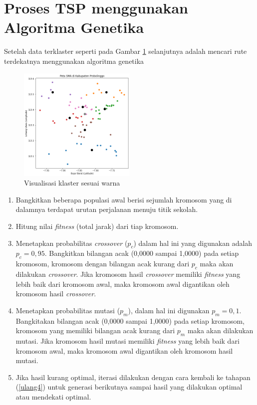 \section{Proses TSP menggunakan Algoritma Genetika}

Setelah data terklaster seperti pada Gambar \ref{fig:hasilklas} selanjutnya adalah mencari rute terdekatnya menggunakan algoritma genetika

\begin{figure}[H]
	\centering
	\includegraphics[width=0.5\textwidth]{Gambar/hasil klaster.png}
	\caption{Visualisasi klaster sesuai warna}
	\label{fig:hasilklas}
\end{figure}

\begin{enumerate}
	\item Bangkitkan beberapa populasi awal berisi sejumlah kromosom yang di dalamnya terdapat urutan perjalanan menuju titik sekolah.
	\item \label{ulang4} Hitung nilai \textit{fitness} (total jarak) dari tiap kromosom.
	\item Menetapkan probabilitas \textit{crossover} ($p_c$) dalam hal ini yang digunakan adalah $p_c=0,95$. Bangkitkan bilangan acak (0,0000 sampai 1,0000) pada setiap kromosom, kromosom dengan bilangan acak kurang dari $p_c$ maka akan dilakukan \textit{crossover}. Jika kromosom hasil \textit{crossover} memiliki \textit{fitness} yang lebih baik  dari kromosom awal, maka kromosom awal digantikan oleh kromosom hasil \textit{crossover}.
	\item Menetapkan probabilitas mutasi ($p_m$), dalam hal ini digunakan $p_m=0,1$. Bangkitakan bilangan acak (0,0000 sampai 1,0000) pada setiap kromosom, kromosom yang memiliki bilangan acak kurang dari $p_m$ maka akan dilakukan mutasi. Jika kromosom hasil mutasi memiliki \textit{fitness} yang lebih baik dari kromosom awal, maka kromosom awal digantikan oleh kromosom hasil mutasi.
	\item Jika hasil kurang optimal, iterasi dilakukan dengan cara kembali ke tahapan (\ref{ulang4}) untuk generasi berikutnya sampai hasil yang dilakukan optimal atau mendekati optimal.
\end{enumerate}

